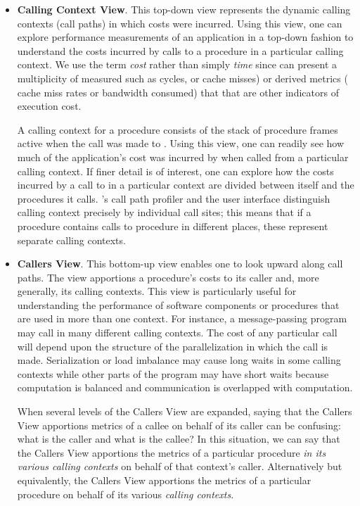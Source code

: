 \begin{itemize}
\item \textbf{Calling Context View}.
  This top-down view represents the dynamic calling contexts (call paths) in which costs were incurred.
  Using this view, one can explore performance measurements of an application in a top-down fashion to understand the costs incurred by calls to a procedure in a particular calling context.
  We use the term \emph{cost} rather than simply \emph{time} since \hpcviewer{} can present a multiplicity of measured such as cycles, or cache misses) or derived metrics (\eg{} cache miss rates or bandwidth consumed) that that are other indicators of execution cost.

  A calling context for a procedure  consists of the stack of procedure frames active when the call was made to .
  Using this view, one can readily see how much of the application's cost was incurred by  when called from a particular calling context.
  If finer detail is of interest, one can explore how the costs incurred by a call to  in a particular context are divided between  itself and the procedures it calls.
  \HPCToolkit{}'s call path profiler \hpcrun{} and the \hpcviewer{} user interface distinguish calling context precisely by individual call sites; this means that if a procedure  contains calls to procedure  in different places, these represent separate calling contexts.

\item \textbf{Callers View}.
  This bottom-up view enables one to look upward along call paths.
  The view apportions a procedure's costs to its caller and, more generally, its calling contexts.
  This view is particularly useful for understanding the performance of software components or procedures that are used in more than one context.
  For instance, a message-passing program may call  in many different calling contexts.
  The cost of any particular call will depend upon the structure of the parallelization in which the call is made.
  Serialization or load imbalance may cause long waits in some calling contexts while other parts of the program may have short waits because computation is balanced and communication is overlapped with computation.

  When several levels of the Callers View are expanded, saying that the Callers View apportions metrics of a callee on behalf of its caller can be confusing: what is the caller and what is the callee?
  In this situation, we can say that the Callers View apportions the metrics of a particular procedure \emph{in its various calling contexts} on behalf of that context's caller.
  Alternatively but equivalently, the Callers View apportions the metrics of a particular procedure on behalf of its various \emph{calling contexts}.


\end{itemize}
